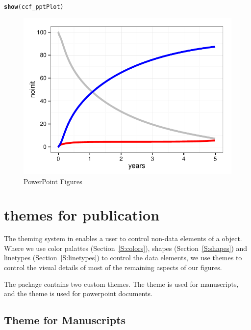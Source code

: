 \documentclass[nojss, letterpaper]{jss}\usepackage[]{graphicx}\usepackage[]{color}
\makeatletter
\def\maxwidth{ %
  \ifdim\Gin@nat@width>\linewidth
    \linewidth
  \else
    \Gin@nat@width
  \fi
}
\newcommand{\hlstd}[1]{\textcolor[rgb]{0.345,0.345,0.345}{#1}}%
\newcommand{\hlkwd}[1]{\textcolor[rgb]{0.737,0.353,0.396}{\textbf{#1}}}%
\newenvironment{kframe}{%
 \def\at@end@of@kframe{}%
 \ifinner\ifhmode%
  \def\at@end@of@kframe{\end{minipage}}%
  \begin{minipage}{\columnwidth}%
 \fi\fi%
 \def\FrameCommand##1{\hskip\@totalleftmargin \hskip-\fboxsep
 \colorbox{shadecolor}{##1}\hskip-\fboxsep
     \hskip-\linewidth \hskip-\@totalleftmargin \hskip\columnwidth}%
 \MakeFramed {\advance\hsize-\width
   \@totalleftmargin\z@ \linewidth\hsize
   \@setminipage}}%
 {\par\unskip\endMakeFramed%
 \at@end@of@kframe}
\newenvironment{knitrout}{}{} %
\makeatother
\begin{document}
\begin{knitrout}
\begin{kframe}
\begin{alltt}
\hlkwd{show}\hlstd{(ccf_pptPlot)}
\end{alltt}
\end{kframe}\begin{figure}[htpb]


{\centering \includegraphics[width=\maxwidth]{figure/beamer-powerpoint} 

}

\caption[PowerPoint Figures]{PowerPoint Figures\label{F:powerpoint}}
\end{figure}


\end{knitrout}


\section[Themes for publications]{ themes for publication}\label{S:themes}
The theming system in  enables a user to control non-data elements of a  object. Where we use color palattes (Section~\ref{S:colors}), shapes (Section~\ref{S:shapes}) and linetypes (Section~\ref{S:linetypes}) to control the data elements, we use themes to control the visual details of most of the remaining aspects of our figures. 

The  package contains two custom themes. The  theme is used for manuscripts, and the  theme is used for powerpoint documents.

\subsection{Theme for Manuscripts}\label{S:theme_man}
\end{document}

